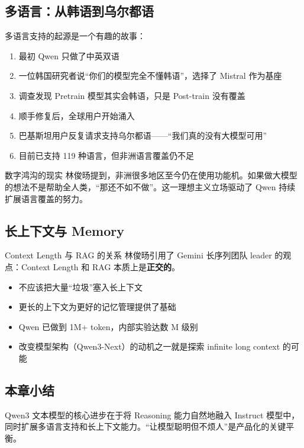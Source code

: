 \subsection{多语言：从韩语到乌尔都语}

多语言支持的起源是一个有趣的故事：

\begin{enumerate}
    \item 最初 Qwen 只做了中英双语
    \item 一位韩国研究者说``你们的模型完全不懂韩语''，选择了 Mistral 作为基座
    \item 调查发现 Pretrain 模型其实会韩语，只是 Post-train 没有覆盖
    \item 顺手修复后，全球用户开始涌入
    \item 巴基斯坦用户反复请求支持乌尔都语——``我们真的没有大模型可用''
    \item 目前已支持 119 种语言，但非洲语言覆盖仍不足
\end{enumerate}

\begin{warningbox}{数字鸿沟的现实}
林俊旸提到，非洲很多地区至今仍在使用功能机。如果做大模型的想法不是帮助全人类，``那还不如不做''。这一理想主义立场驱动了 Qwen 持续扩展语言覆盖的努力。
\end{warningbox}

\subsection{长上下文与 Memory}

\begin{knowledgebox}{Context Length 与 RAG 的关系}
林俊旸引用了 Gemini 长序列团队 leader 的观点：Context Length 和 RAG 本质上是\textbf{正交的}。
\begin{itemize}
    \item 不应该把大量``垃圾''塞入长上下文
    \item 更长的上下文为更好的记忆管理提供了基础
    \item Qwen 已做到 1M+ token，内部实验达数 M 级别
    \item 改变模型架构（Qwen3-Next）的动机之一就是探索 infinite long context 的可能
\end{itemize}
\end{knowledgebox}

\subsection{本章小结}

Qwen3 文本模型的核心进步在于将 Reasoning 能力自然地融入 Instruct 模型中，同时扩展多语言支持和长上下文能力。``让模型聪明但不烦人''是产品化的关键平衡。

